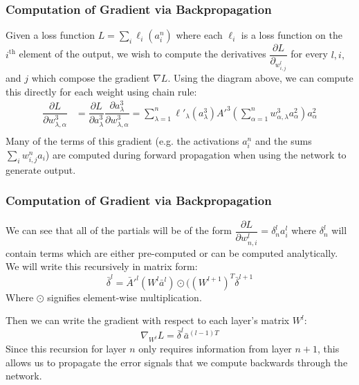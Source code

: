 \begin{frame}
  \frametitle{Computation of Gradient via Backpropagation}
Given a loss function $L = \sum_{i} \ell_i(a^n_i)$ where each $\ell_i$ is a loss function on the $i^{\text{th}}$ element of the output, we wish to compute the derivatives $\dfrac{\partial L}{\partial_{w^l_{i,j}}}$ for every $l, i,$ and $j$ which compose the gradient $\nabla L$. Using the diagram above, we can compute this directly for each weight using chain rule:
\begin{align*}
    \dfrac{\partial L}{\partial w^3_{\lambda,\alpha}} &= \dfrac{\partial L}{\partial a^3_{\lambda}} \dfrac{\partial a^3_{\lambda}}{\partial w^3_{\lambda,\alpha}} = \sum_{\lambda=1}^n \ell'_\lambda( a^3_\lambda) A'^3 (\sum_{\alpha=1}^n w^3_{\alpha, \lambda} a_\alpha^2) a^2_\alpha\\    
\end{align*}
Many of the terms of this gradient (e.g. the activations $a^n_i$ and the sums $\sum_{i} w^n_{i,j} a_i$) are computed during forward propagation when using the network to generate output. 

\end{frame}

\begin{frame}
  \frametitle{Computation of Gradient via Backpropagation}
We can see that all of the partials will be of the form 
$\dfrac{\partial L}{\partial w^l_{n, i}} = \delta^l_n a^l_i$ where
$\delta^l_n$  will contain terms which are either pre-computed or can
be computed analytically. We will write this recursively in matrix form: 
\[\bar \delta^l = \bar A'^l(W^l \bar a^l) \odot ((W^{l+1})^T \bar \delta^{l+1}\]
Where $\odot$ signifies element-wise multiplication. 

Then we can write the gradient with respect to each layer's matrix $W^l$: 
\[\nabla_{W^l} L = \bar \delta^l \bar a^{(l-1)T}\]
Since this recursion for layer $n$ only requires information from layer $n+1$, this allows us to propagate the error signals that we compute backwards through the network. 

\end{frame}

